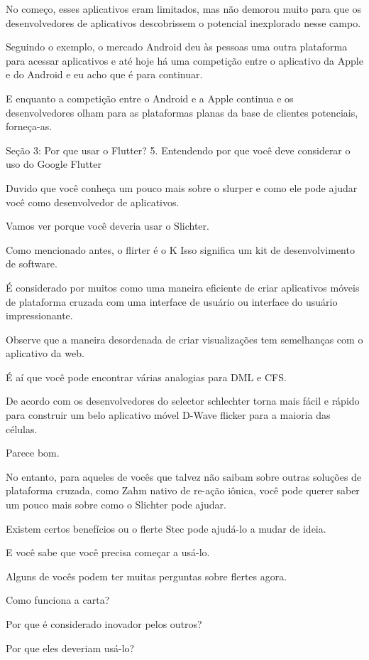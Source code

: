 No começo, esses aplicativos eram limitados, mas não demorou muito para que os desenvolvedores de aplicativos descobrissem o potencial inexplorado nesse campo.

Seguindo o exemplo, o mercado Android deu às pessoas uma outra plataforma para acessar aplicativos e até hoje há uma competição entre o aplicativo da Apple e do Android e eu acho que é para continuar.

E enquanto a competição entre o Android e a Apple continua e os desenvolvedores olham para as plataformas planas da base de clientes potenciais, forneça-as.


Seção 3: Por que usar o Flutter?
5. Entendendo por que você deve considerar o uso do Google
Flutter


Duvido que você conheça um pouco mais sobre o slurper e como ele pode ajudar você como desenvolvedor de aplicativos.

Vamos ver porque você deveria usar o Slichter.

Como mencionado antes, o flirter é o K Isso significa um kit de desenvolvimento de software.

É considerado por muitos como uma maneira eficiente de criar aplicativos móveis de plataforma cruzada com uma interface de usuário ou interface do usuário impressionante.

Observe que a maneira desordenada de criar visualizações tem semelhanças com o aplicativo da web.

É aí que você pode encontrar várias analogias para DML e CFS.

De acordo com os desenvolvedores do selector schlechter torna mais fácil e rápido para construir um belo aplicativo móvel D-Wave flicker para a maioria das células.

Parece bom.

No entanto, para aqueles de vocês que talvez não saibam sobre outras soluções de plataforma cruzada, como Zahm nativo de re-ação iônica, você pode querer saber um pouco mais sobre como o Slichter pode ajudar.

Existem certos benefícios ou o flerte Stec pode ajudá-lo a mudar de ideia.

E você sabe que você precisa começar a usá-lo.

Alguns de vocês podem ter muitas perguntas sobre flertes agora.

Como funciona a carta?

Por que é considerado inovador pelos outros?

Por que eles deveriam usá-lo?

